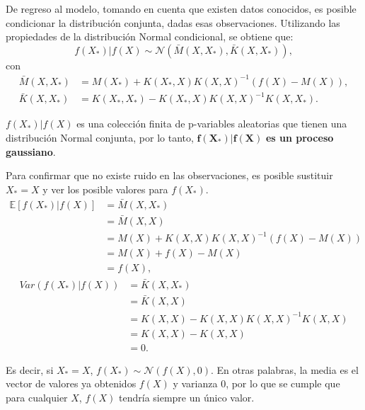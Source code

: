De regreso al modelo, tomando en cuenta que existen datos conocidos, es posible condicionar la distribución conjunta, dadas esas observaciones. Utilizando las propiedades de la distribución Normal condicional, se obtiene que:
\begin{equation*}
    f(X_*)|f(X) 
    \sim \mathcal{N}
    (\bar{M}(X,X_*),\bar{K}(X,X_*)),
\end{equation*}
con
\begin{equation*}
\begin{aligned}
    \bar{M}(X,X_*) &= M(X_*) + K(X_*,X)K(X,X)^{-1}(f(X) - M(X)), \\
    \bar{K}(X,X_*) &= K(X_*,X_*) - K(X_*,X)K(X,X)^{-1}K(X,X_*).
\end{aligned}
\end{equation*}

\begin{obs}
    $f(X_*)|f(X)$ es una colección finita de p-variables aleatorias que tienen una distribuci\'on Normal conjunta, por lo tanto, $\mathbf{f(X_*)|f(X)}$ \textbf{es un proceso gaussiano}. 
\end{obs}

Para confirmar que no existe ruido en las observaciones, es posible sustituir $X_* = X$ y ver los posible valores para $f(X_*)$.
\begin{equation*}
\begin{aligned}
    \mathbb{E}[f(X_*)|f(X)] 
    &= \bar{M}(X,X_*) \\
    &= \bar{M}(X,X) \\
    &= M(X) + K(X,X)K(X,X)^{-1}(f(X) - M(X)) \\
    &= M(X) + f(X) - M(X) \\
    &= f(X) ,
\end{aligned}
\end{equation*}
\begin{equation*}
\begin{aligned}
    Var(f(X_*)|f(X)) 
    &= \bar{K}(X,X_*) \\
    &= \bar{K}(X,X) \\
    &= K(X,X) - K(X,X)K(X,X)^{-1}K(X,X) \\
    &= K(X,X) - K(X,X) \\
    &= 0.
\end{aligned}
\end{equation*}

Es decir, si $X_* = X$, $f(X_*) \sim \mathcal{N}(f(X),0)$. En otras palabras, la media es el vector de valores ya obtenidos $f(X)$ y varianza 0, por lo que se cumple que para cualquier $X$, $f(X)$ tendría siempre un único valor.

